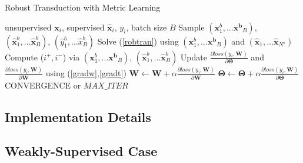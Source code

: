 \begin{algorithm}[tb]
   \caption{Robust Transduction with Metric Learning}
   \label{alg:example}
\begin{algorithmic}
    unsupervised $\mathbf{x}_i$, supervised $\mathbf{\hat{x}}_i$, $y_i$, batch size $B$
   \REPEAT
   \STATE  Sample $(\mathbf{x}^b_1,\ldots \mathbf{x^b}_B)$, $(\mathbf{\hat{x}}^b_1,\ldots \mathbf{\hat{x}}^b_B)$, $(\hat{y}^b_1,\ldots \hat{x}^b_B)$
   \STATE Solve (\ref{robtran}) using $(\mathbf{x}^b_1,\ldots \mathbf{x^b}_B)$ and  $(\mathbf{\hat{x}}_1,\ldots \mathbf{\hat{x}}_{N^s})$
   \STATE Compute ($i^+, i^-$) via $(\mathbf{x}^b_1,\ldots \mathbf{x^b}_B)$, $(\mathbf{\hat{x}}^b_1,\ldots \mathbf{\hat{x}}^b_B)$ 
   \STATE Update $\frac{\partial loss (y_i, \mathbf{W})}{\partial \mathbf{\Theta}}$ and  $\frac{\partial loss (y_i, \mathbf{W})}{\partial \mathbf{W}} $ using (\ref{gradw},\ref{gradt})
   \ENDIF
   \ENDFOR
   \STATE $\mathbf{W} \leftarrow \mathbf{W} + \alpha \frac{\partial loss (y_i, \mathbf{W})}{\partial \mathbf{W}}$ 
   \STATE $\mathbf{\Theta} \leftarrow \mathbf{\Theta} + \alpha \frac{\partial loss (y_i, \mathbf{W})}{\partial \mathbf{\Theta}}$
   \UNTIL CONVERGENCE or $MAX\_ITER$
\end{algorithmic}
\end{algorithm}

\subsection{Implementation Details}

\subsection{Weakly-Supervised Case}
